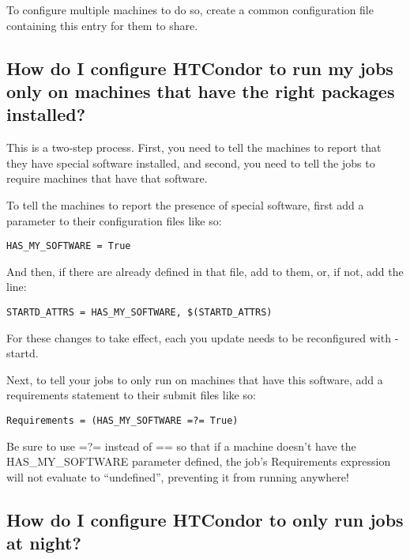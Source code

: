 To configure multiple machines to do so, create a common
configuration file containing this entry for them to share.

\subsection*{How do I configure HTCondor to run my jobs only on machines that have the right packages installed?}

This is a two-step process.
First, you need to tell the machines to report that they have special
software installed, and second, you need to tell the jobs to require
machines that have that software.

To tell the machines to report the presence of special software, first
add a parameter to their configuration files like so:

\begin{verbatim}
HAS_MY_SOFTWARE = True
\end{verbatim}

And then, if there are already  defined in that file, add
 to them, or, if not, add the line:

\footnotesize
\begin{verbatim}
STARTD_ATTRS = HAS_MY_SOFTWARE, $(STARTD_ATTRS)
\end{verbatim}
\normalsize

\Note For these changes to take effect, each  you update
needs to be reconfigured with  -startd.

Next, to tell your jobs to only run on machines that have this
software, add a requirements statement to their submit files like so:

\footnotesize
\begin{verbatim}
Requirements = (HAS_MY_SOFTWARE =?= True)
\end{verbatim}
\normalsize

\Note Be sure to use =?= instead of == so that if a machine doesn't have
the HAS\_MY\_SOFTWARE parameter defined, the job's Requirements
expression will not evaluate to ``undefined'', preventing it from
running anywhere!


\subsection*{How do I configure HTCondor to only run jobs at night?}

